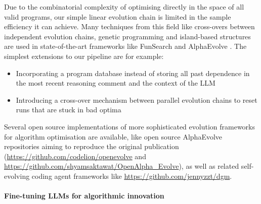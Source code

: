 \documentclass[12pt, legalpaper]{article}
\begin{document}
Due to the combinatorial complexity of optimising directly in the space of all valid programs, our simple linear evolution chain is limited in the sample efficiency it can achieve. 
Many techniques from this field like cross-overs between independent evolution chains, genetic programming and island-based structures are used in state-of-the-art frameworks like FunSearch and AlphaEvolve \citep{romera2024mathematical, novikov2025alphaevolve}. 
The simplest extensions to our pipeline are for example:
%
\begin{itemize}
    \item Incorporating a program database instead of storing all past dependence in the most recent reasoning comment and the context of the LLM

    \item Introducing a cross-over mechanism between parallel evolution chains to reset runs that are stuck in bad optima
\end{itemize} 
%
Several open source implementations of more sophisticated evolution frameworks for algorithm optimisation are available, like open source AlphaEvolve repositories aiming to reproduce the original publication (\href{https://github.com/codelion/openevolve}{https://github.com/codelion/openevolve} and \href{https://github.com/shyamsaktawat/OpenAlpha_Evolve}{https://github.com/shyamsaktawat/OpenAlpha\_Evolve}), as well as related self-evolving coding agent frameworks like \href{https://github.com/jennyzzt/dgm}{https://github.com/jennyzzt/dgm}.


\paragraph{Fine-tuning LLMs for algorithmic innovation}
\end{document}

